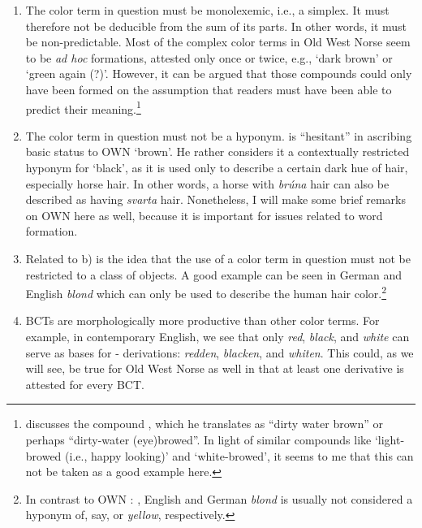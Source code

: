 \documentclass[output=paper,colorlinks,citecolor=brown]{langscibook}
\begin{document}
\begin{enumerate}

    \item[a)] The color term in question must be monolexemic, i.e., a simplex. It must therefore not be deducible from the sum of its parts. In other words, it must be non-predictable. Most of the complex color terms in Old West Norse seem to be \textit{ad hoc} formations, attested only once or twice, e.g.,  ‘dark brown’ or  ‘green again (?)’. However, it can be argued that those compounds could only have been formed on the assumption that readers must have been able to predict their meaning.\footnote{\citet[126]{Crawford2014} discusses the compound , which he translates as “dirty water brown” or perhaps “dirty-water (eye)browed”. In light of similar compounds like  ‘light-browed (i.e., happy looking)’ and  ‘white-browed’, it seems to me that this can not be taken as a good example here.}

    \item[b)] The color term in question must not be a hyponym. \citet[59]{Crawford2014} is “hesitant” in ascribing basic status to OWN  ‘brown’. He rather considers it a contextually restricted hyponym for  ‘black’, as it is used only to describe a certain dark hue of hair, especially horse hair. In other words, a horse with \textit{brúna} hair can also be described as having \textit{svarta}  hair. Nonetheless, I will make some brief remarks on OWN  here as well, because it is important for issues related to word formation.

    \item[c)] Related to b) is the idea that the use of a color term in question must not be restricted to a class of objects. A good example can be seen in German and English \textit{blond}  which can only be used to describe the human hair color.\footnote{In contrast to OWN  : , English and German \textit{blond} is usually not considered a hyponym of, say,  or \textit{yellow}, respectively.}

    \item[d)] BCTs  are morphologically more productive than other color terms. For example, in contemporary English, we see that only \textit{red}, \textit{black}, and \textit{white} can serve as bases for - derivations: \textit{redden}, \textit{blacken}, and \textit{whiten}. This could, as we will see, be true for Old West Norse as well in that at least one derivative is attested for every BCT.


\end{enumerate}
\end{document}
